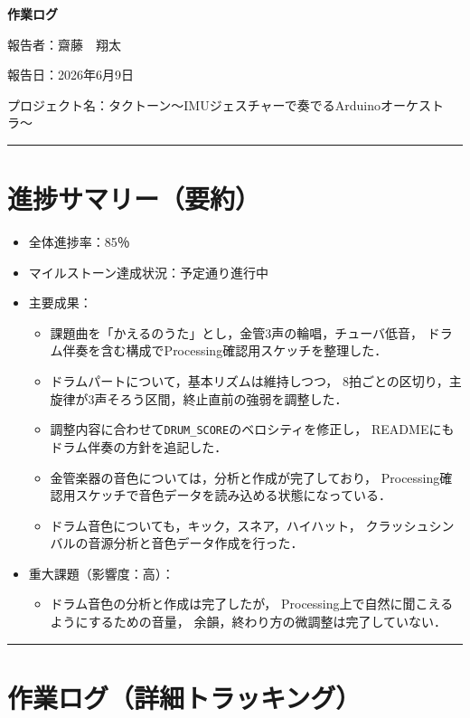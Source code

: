\documentclass[uplatex,dvipdfmx,a4paper,11pt]{jsarticle}
\newcommand{\sectionrule}{\par\medskip\noindent\rule{\linewidth}{0.6pt}\par\medskip}
\begin{document}
{\LARGE\bfseries 作業ログ}\par\bigskip

報告者：齋藤　翔太

報告日：2026年6月9日

プロジェクト名：タクトーン〜IMUジェスチャーで奏でるArduinoオーケストラ〜

\sectionrule

\section{進捗サマリー（要約）}

\begin{itemize}
  \item 全体進捗率：85％
  \item マイルストーン達成状況：予定通り進行中
  \item 主要成果：
    \begin{itemize}
      \item {}課題曲を「かえるのうた」とし，金管3声の輪唱，チューバ低音，
        ドラム伴奏を含む構成でProcessing確認用スケッチを整理した．
      \item {}ドラムパートについて，基本リズムは維持しつつ，
        8拍ごとの区切り，主旋律が3声そろう区間，終止直前の強弱を調整した．
      \item {}調整内容に合わせて\texttt{DRUM\_SCORE}のベロシティを修正し，
        READMEにもドラム伴奏の方針を追記した．
      \item {}金管楽器の音色については，分析と作成が完了しており，
        Processing確認用スケッチで音色データを読み込める状態になっている．
      \item {}ドラム音色についても，キック，スネア，ハイハット，
        クラッシュシンバルの音源分析と音色データ作成を行った．
    \end{itemize}
  \item 重大課題（影響度：高）：
    \begin{itemize}
      \item {}ドラム音色の分析と作成は完了したが，
        Processing上で自然に聞こえるようにするための音量，
        余韻，終わり方の微調整は完了していない．
    \end{itemize}
\end{itemize}

\sectionrule

\section{作業ログ（詳細トラッキング）}
\end{document}
